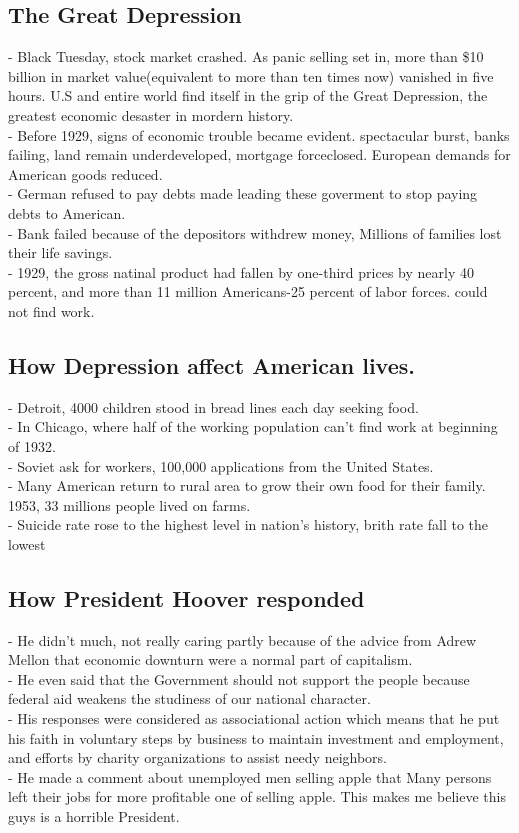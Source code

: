 \documentclass{article}
\begin{document}
\subsection{ The Great Depression}
- Black Tuesday, stock market crashed. As panic selling set in, more than \$10 billion in market value(equivalent to more than ten times now) vanished in five hours. U.S and entire world find itself in the grip of the Great Depression, the greatest economic desaster in mordern history.\\
- Before 1929, signs of economic trouble became evident. spectacular burst, banks failing, land remain underdeveloped, mortgage forceclosed. European demands for American goods reduced. \\
- German refused to pay debts made leading these goverment to stop paying debts to American.\\
- Bank failed because of the depositors withdrew money, Millions of families lost their life savings.\\
- 1929, the gross natinal product had fallen by one-third prices by nearly 40 percent, and more than 11 million Americans-25 percent of labor forces. could not find work.\\

\subsection{How Depression affect American lives.}
- Detroit, 4000 children stood in bread lines each day seeking food.\\
- In Chicago, where half of the working population can't find work at beginning of 1932.\\
- Soviet ask for workers, 100,000 applications from the United States.\\
- Many American return to rural area to grow their own food for their family. 1953, 33 millions people lived on farms.\\
- Suicide rate rose to the highest level in nation's history, brith rate fall to the lowest\\

\subsection{ How President Hoover responded}
- He didn't much, not really caring partly because of the advice from Adrew Mellon that economic downturn were a normal part of capitalism.\\
- He even said that the Government should not support the people because federal aid weakens the studiness of our national character.\\
- His responses were considered as associational action which means that he put his faith in voluntary steps by business to maintain investment and employment, and efforts by charity organizations to assist needy neighbors.\\
- He made a comment about unemployed men selling apple that Many persons left their jobs for more profitable one of selling apple. This makes me believe this guys is a horrible President.\\
\end{document}

